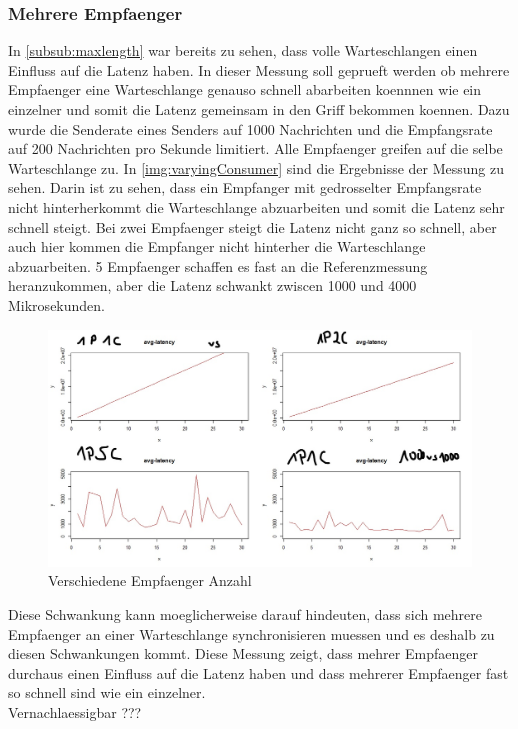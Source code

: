 \subsubsection{Mehrere Empfaenger}
In \autoref{subsub:maxlength} war bereits zu sehen, dass volle Warteschlangen einen Einfluss auf die Latenz haben. In dieser Messung soll geprueft werden ob mehrere Empfaenger eine Warteschlange genauso schnell abarbeiten koennnen wie ein einzelner und somit die Latenz gemeinsam in den Griff bekommen koennen. Dazu wurde die Senderate eines Senders auf 1000 Nachrichten und die Empfangsrate auf 200 Nachrichten pro Sekunde limitiert. Alle Empfaenger greifen auf die selbe Warteschlange zu.
In \autoref{img:varyingConsumer} sind die Ergebnisse der Messung zu sehen. Darin ist zu sehen, dass ein Empfanger mit gedrosselter Empfangsrate nicht hinterherkommt die Warteschlange abzuarbeiten und somit die Latenz sehr schnell steigt. Bei zwei Empfaenger steigt die Latenz nicht ganz so schnell, aber auch hier kommen die Empfanger nicht hinterher die Warteschlange abzuarbeiten. 5 Empfaenger schaffen es fast an die Referenzmessung heranzukommen, aber die Latenz schwankt zwiscen 1000 und 4000 Mikrosekunden.
\begin{figure}
\center
  \includegraphics[width=1\textwidth]{images/varyingConsumer.jpg}
  \caption{Verschiedene Empfaenger Anzahl}
  \label{img:varyingConsumer}
\end{figure}
Diese Schwankung kann moeglicherweise darauf hindeuten, dass sich mehrere Empfaenger an einer Warteschlange synchronisieren muessen und es deshalb zu diesen Schwankungen kommt. Diese Messung zeigt, dass mehrer Empfaenger durchaus einen Einfluss auf die Latenz haben und dass mehrerer Empfaenger fast so schnell sind wie ein einzelner. \\
Vernachlaessigbar ???

